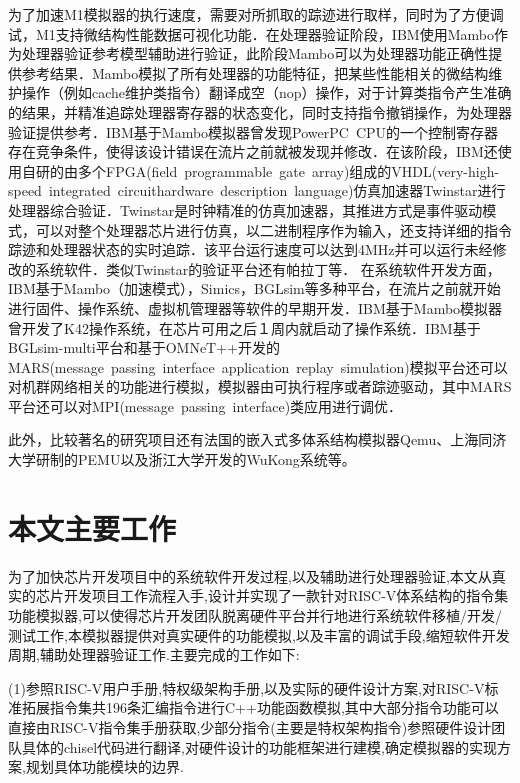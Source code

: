 为了加速M1模拟器的执行速度，需要对所抓取的踪迹进行取样，同时为了方便调试，M1支持微结构性能数据可视化功能．在处理器验证阶段，IBM使用Mambo作为处理器验证参考模型辅助进行验证，此阶段Mambo可以为处理器功能正确性提供参考结果．Mambo模拟了所有处理器的功能特征，把某些性能相关的微结构维护操作（例如cache维护类指令）翻译成空（nop）操作，对于计算类指令产生准确的结果，并精准追踪处理器寄存器的状态变化，同时支持指令撤销操作，为处理器验证提供参考．IBM基于Mambo模拟器曾发现PowerPC CPU的一个控制寄存器存在竞争条件，使得该设计错误在流片之前就被发现并修改．在该阶段，IBM还使用自研的由多个FPGA(field programmable gate array)组成的VHDL(very-high-speed integrated circuithardware description language)仿真加速器Twinstar\cite{asaad2012cycle}进行处理器综合验证．Twinstar是时钟精准的仿真加速器，其推进方式是事件驱动模式，可以对整个处理器芯片进行仿真，以二进制程序作为输入，还支持详细的指令踪迹和处理器状态的实时追踪．该平台运行速度可以达到4MHz并可以运行未经修改的系统软件．类似Twinstar的验证平台还有帕拉丁\cite{chaix2019implementation}等．
在系统软件开发方面，IBM基于Mambo（加速模式），Simics\cite{magnusson2002simics}，BGLsim\cite{ceze2003full}等多种平台，在流片之前就开始进行固件、操作系统、虚拟机管理器等软件的早期开发．IBM基于Mambo模拟器曾开发了K42操作系统，在芯片可用之后１周内就启动了操作系统\cite{boh}．IBM基于BGLsim-multi\cite{ceze2003full}平台和基于OMNeT++\cite{varga2010omnet}开发的MARS(message passing interface application replay simulation)模拟平台还可以对机群网络相关的功能进行模拟，模拟器由可执行程序或者踪迹驱动\cite{许鹏2006一种应用于嵌入式系统中断控制}，其中MARS平台还可以对MPI(message passing interface)类应用进行调优．


此外，比较著名的研究项目还有法国的嵌入式多体系结构模拟器Qemu\cite{bellard2005qemu}、上海同济大学研制的PEMU\cite{huang}以及浙江大学开发的WuKong系统\cite{wukong}等。


\section{本文主要工作}
为了加快芯片开发项目中的系统软件开发过程,以及辅助进行处理器验证,本文从真实的芯片开发项目工作流程入手,设计并实现了一款针对RISC-V体系结构的指令集功能模拟器,可以使得芯片开发团队脱离硬件平台并行地进行系统软件移植/开发/测试工作,本模拟器提供对真实硬件的功能模拟,以及丰富的调试手段,缩短软件开发周期,辅助处理器验证工作.主要完成的工作如下:


(1)参照RISC-V用户手册,特权级架构手册,以及实际的硬件设计方案,对RISC-V标准拓展指令集共196条汇编指令进行C++功能函数模拟,其中大部分指令功能可以直接由RISC-V指令集手册获取,少部分指令(主要是特权架构指令)参照硬件设计团队具体的chisel代码进行翻译,对硬件设计的功能框架进行建模,确定模拟器的实现方案,规划具体功能模块的边界.


